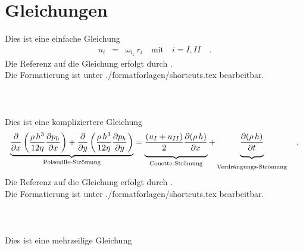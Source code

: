 %
\section{Gleichungen}\label{sec:gleichungen}
%
Dies ist eine einfache Gleichung
%
\begin{eqnarray}\label{gl:einfache_gleichung}
  u_i & = & \omega_{i_z}\,r_i \quad \text{mit} \quad i=I,II\quad.
\end{eqnarray}
%
Die Referenz auf die Gleichung erfolgt durch .\\
Die Formatierung ist unter ./formatforlagen/shortcuts.tex bearbeitbar.\\\\\\\\
%
Dies ist eine kompliziertere Gleichung
%
\begin{eqnarray}\label{gl:kompliziertere_gleichung}
  \underbrace{\dfrac{\partial}{\partial x} \left(\dfrac{\rho\, h^3}{12 \eta} \dfrac{\partial p_h}{\partial x}\right)
  + \dfrac{\partial}{\partial y} \left(\dfrac{\rho\, h^3}{12 \eta} \dfrac{\partial p_h}{\partial y}\right)}_{\text{Poiseuille-Strömung}}
  = \underbrace{\rule[-11pt]{0pt}{0pt}\dfrac{(u_I+u_{II})}{2} \dfrac{\partial(\rho\, h)}{\partial x}}_{\text{Couette-Strömung}}
  + \underbrace{\rule[-11pt]{0pt}{0pt}\dfrac{\partial(\rho\, h)}{\partial t}}_{\rule[9pt]{0pt}{0pt}\text{Verdrängungs-Strömung}}\quad.
\end{eqnarray}
%
Die Referenz auf die Gleichung erfolgt durch .\\
Die Formatierung ist unter ./formatforlagen/shortcuts.tex bearbeitbar.\\\\\\\\
%
Dies ist eine mehrzeilige Gleichung
%
